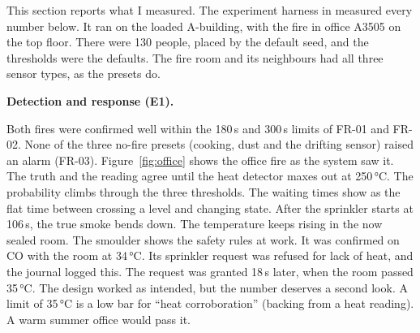 This section reports what I measured. The experiment harness in
 measured every number below. It ran on the
loaded A-building, with the fire in office A3505 on the top floor. There were 130
people, placed by the default seed, and the thresholds were the defaults. The fire
room and its neighbours had all three sensor types, as the presets do.

\textbf{Detection and response (E1).}

\begin{table}[H]
\centering
\footnotesize
{}
\caption{One run of each preset. Times are in seconds since ignition. RSET runs from ignition until the last of 130 people is out. In every caught case, the building was empty 111\,s after the alarm.}
\label{tab:presets}
\end{table}

Both fires were confirmed well within the 180\,s and 300\,s limits of FR-01 and
FR-02. None of the three no-fire presets (cooking, dust and the drifting sensor)
raised an alarm (FR-03). Figure~\ref{fig:office} shows the office fire as the
system saw it. The truth and the reading agree until the heat detector maxes out
at 250\,°C. The probability climbs through the three thresholds. The waiting
times show as the flat time between crossing a level and changing state. After the
sprinkler starts at 106\,s, the true smoke bends down. The temperature keeps
rising in the now sealed room. The smoulder shows the safety rules at work. It was
confirmed on CO with the room at 34\,°C. Its sprinkler request was refused for
lack of heat, and the journal logged this. The request was granted 18\,s later,
when the room passed 35\,°C. The design worked as intended, but the number
deserves a second look. A limit of 35\,°C is a low bar for ``heat
corroboration'' (backing from a heat reading). A warm summer office would pass it.


